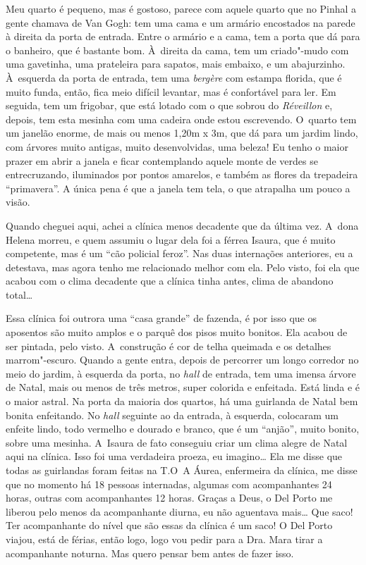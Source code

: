 Meu quarto é pequeno, mas é gostoso, parece com aquele quarto que no
Pinhal a gente chamava de Van Gogh: tem uma cama e um armário encostados
na parede à direita da porta de entrada. Entre o armário e a cama, tem a
porta que dá para o banheiro, que é bastante bom. À~direita da cama, tem
um criado"-mudo com uma gavetinha, uma prateleira para sapatos, mais
embaixo, e um abajurzinho. À~esquerda da porta de entrada, tem uma
\emph{bergère} com estampa florida, que é muito funda, então, fica meio
difícil levantar, mas é confortável para ler. Em seguida, tem um
frigobar, que está lotado com o que sobrou do \emph{Réveillon} e,
depois, tem esta mesinha com uma cadeira onde estou escrevendo. O~quarto
tem um janelão enorme, de mais ou menos 1,20m x 3m, que dá para um
jardim lindo, com árvores muito antigas, muito desenvolvidas, uma
beleza! Eu tenho o maior prazer em abrir a janela e ficar contemplando
aquele monte de verdes se entrecruzando, iluminados por pontos amarelos,
e também as flores da trepadeira ``primavera''. A única pena é que a
janela tem tela, o que atrapalha um pouco a visão.

Quando cheguei aqui, achei a clínica menos decadente que da última vez.
A~dona Helena morreu, e quem assumiu o lugar dela foi a férrea Isaura,
que é muito competente, mas é um ``cão policial feroz''. Nas duas
internações anteriores, eu a detestava, mas agora tenho me relacionado
melhor com ela. Pelo visto, foi ela que acabou com o clima decadente que
a clínica tinha antes, clima de abandono total…

Essa clínica foi outrora uma ``casa grande'' de fazenda, é por isso que
os aposentos são muito amplos e o parquê dos pisos muito bonitos. Ela
acabou de ser pintada, pelo visto. A~construção é cor de telha queimada
e os detalhes marrom"-escuro. Quando a gente entra, depois de percorrer
um longo corredor no meio do jardim, à esquerda da porta, no \emph{hall}
de entrada, tem uma imensa árvore de Natal, mais ou menos de três
metros, super colorida e enfeitada. Está linda e é o maior astral. Na
porta da maioria dos quartos, há uma guirlanda de Natal bem bonita
enfeitando. No \emph{hall} seguinte ao da entrada, à esquerda, colocaram
um enfeite lindo, todo vermelho e dourado e branco, que é um ``anjão'',
muito bonito, sobre uma mesinha. A~Isaura de fato conseguiu criar um
clima alegre de Natal aqui na clínica. Isso foi uma verdadeira proeza,
eu imagino… Ela me disse que todas as guirlandas foram feitas na
T.O\,
A Áurea, enfermeira da clínica, me disse que no momento há 18 pessoas
internadas, algumas com acompanhantes 24 horas, outras com acompanhantes
12 horas. Graças a Deus, o Del Porto me liberou pelo menos da
acompanhante diurna, eu não aguentava mais… Que saco! Ter
acompanhante do nível que são essas da clínica é um saco! O Del Porto
viajou, está de férias, então logo, logo vou pedir para a Dra. Mara
tirar a acompanhante noturna. Mas quero pensar bem antes de fazer isso.


